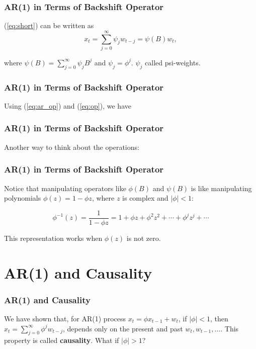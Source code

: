 \documentclass[%
xcolor=pdftex]{beamer}
\begin{document}
\begin{frame}
\frametitle{AR(1) in Terms of Backshift Operator}

(\ref{eq:short}) can be written as
\begin{equation} \label{eq:op}
x_t=\sum_{j=0}^{\infty} \psi_j w_{t-j} = \psi(B)w_t,
\end{equation}

where $\psi(B) = \sum_{j=0}^{\infty} \psi_j B^j$ and $\psi_j = \phi^j$. $\psi_j$ called psi-weights.

\end{frame}

\begin{frame}
\frametitle{AR(1) in Terms of Backshift Operator}

Using (\ref{eq:ar_op}) and (\ref{eq:op}), we have

\vspace{50mm}

\end{frame}

\begin{frame}
\frametitle{AR(1) in Terms of Backshift Operator}

Another way to think about the operations:

\vspace{50mm}


\end{frame}

\begin{frame}
\frametitle{AR(1) in Terms of Backshift Operator}

Notice that manipulating operators like $\phi(B)$ and $\psi(B)$ is like manipulating polynomials $\phi(z) = 1-\phi z$, where $z$ is complex and $|\phi| < 1$:

$$
\phi^{-1}(z) = \frac{1}{1- \phi z} = 1 + \phi z + \phi^2 z^2 + \cdots + \phi^j z^j + \cdots
$$


This representation works when $\phi(z)$ is not zero.

\end{frame}


\section{AR(1) and Causality}
\frame{\tableofcontents[currentsection]}

\begin{frame}
\frametitle{AR(1) and Causality}

We have shown that, for AR(1) process $x_t=\phi x_{t-1}+w_t$, if $|\phi|<1$,
 then $x_t=\sum^{\infty}_{j=0} \phi^j w_{t-j}$, depends only on
 the present and past $w_t,w_{t-1},\ldots.$ This property is called \textbf{causality}. What if $|\phi| > 1$?


\end{frame}
\end{document}
